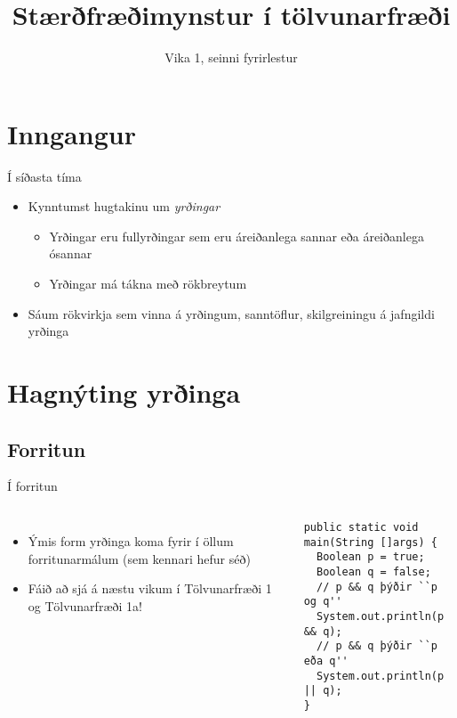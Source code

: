 \documentclass{beamer}
\title{Stærðfræðimynstur í tölvunarfræði}
\subtitle{Vika 1, seinni fyrirlestur}
\begin{document}
\begin{frame}
\titlepage
\end{frame}

\section{Inngangur}

\begin{frame}{Í síðasta tíma}
\begin{itemize}
 \item Kynntumst hugtakinu um \emph{yrðingar}
 \begin{itemize}
  \item Yrðingar eru fullyrðingar sem eru áreiðanlega sannar eða áreiðanlega ósannar
  \item Yrðingar má tákna með rökbreytum
 \end{itemize}
 \item Sáum rökvirkja sem vinna á yrðingum, sanntöflur, skilgreiningu á jafngildi yrðinga
\end{itemize}
\end{frame}

\section{Hagnýting yrðinga}

\subsection{Forritun}

\begin{frame}[fragile]{Í forritun}
\begin{columns}
\begin{itemize}
 \item Ýmis form yrðinga koma fyrir í öllum forritunarmálum (sem kennari hefur séð)
 \item Fáið að sjá á næstu vikum í Tölvunarfræði 1 og Tölvunarfræði 1a!
\end{itemize}
\begin{verbatim}
public static void main(String []args) {
  Boolean p = true;
  Boolean q = false;
  // p && q þýðir ``p og q''
  System.out.println(p && q);
  // p && q þýðir ``p eða q''
  System.out.println(p || q);
}
\end{verbatim}

\end{columns}
\end{frame}
\end{document}
